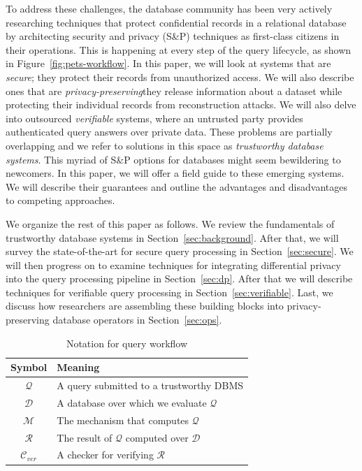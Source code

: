 \documentclass[11pt]{article}
\newcommand{\mechanism}{$\mathcal{M}$\xspace}
\newcommand{\db}{$\mathcal{D}$\xspace}
\newcommand{\answer}{$\mathcal{R}$\xspace}
\newcommand{\query}{$\mathcal{Q}$\xspace}
\newcommand{\sandp}{S\&P\xspace}
\begin{document}
To address these challenges, the database community has been very actively researching techniques that protect confidential records in a relational database by architecting security and privacy (S\&P) techniques as first-class citizens in their operations.  This is happening at every step of the query lifecycle, as shown in Figure~\ref{fig:pets-workflow}.  In this paper, we will look at systems that are {\em secure}; they protect their records from unauthorized access.  We will also describe ones that are {\em privacy-preserving}\textendash they release information about a dataset while protecting their individual records from reconstruction attacks.  We will also delve into outsourced {\em verifiable} systems, where an untrusted party provides authenticated query answers over private data.  These problems are partially overlapping and we refer to solutions in this space as  {\em trustworthy database systems}.  This myriad of \sandp options for databases might seem bewildering to newcomers.  In this paper, we will offer a field guide to these emerging systems.  We will describe their guarantees and outline the advantages and disadvantages to competing approaches.    

We organize the rest of this paper as follows. We review the fundamentals of trustworthy database systems in Section~\ref{sec:background}.  After that, we will survey the state-of-the-art for secure query processing in Section~\ref{sec:secure}.  We will then progress on to examine techniques for integrating differential privacy into the query processing pipeline in Section~\ref{sec:dp}.  After that we will describe techniques for verifiable query processing in Section~\ref{sec:verifiable}.  Last, we discuss how researchers are assembling these building blocks into privacy-preserving database operators in  Section~\ref{sec:ops}. 


\begin{table}
  \centering
  \vspace{-4mm}
    \begin{tabular}{c|l}
        Symbol & Meaning  \\
        \hline
        \query & A query submitted to a trustworthy DBMS\\
        \db & A database over which we evaluate \query \\
        \mechanism & The mechanism that computes \query \\
        \answer & The result of \query computed over \db\\
        $\mathcal{C}_{ver}$   & A checker for verifying \answer\\
    \end{tabular}
    \caption{Notation for query workflow}
      \vspace{-4mm}
    \label{tbl:notation}
\end{table}
\end{document}
